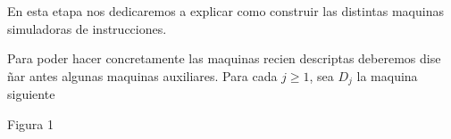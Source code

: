 \begin{frame}
  En esta etapa nos dedicaremos a explicar como construir las
  distintas maquinas simuladoras de instrucciones.

  Para poder hacer concretamente las maquinas recien descriptas deberemos dise%
  \~{n}ar antes algunas maquinas auxiliares. Para cada $j\geq 1$, sea $D_{j}$
  la maquina siguiente

  \bigskip

  \bigskip

  \bigskip

  \bigskip

  Figura 1
\end{frame}
